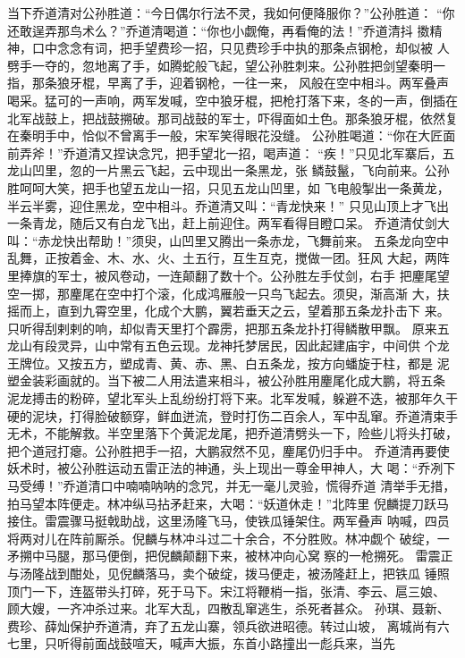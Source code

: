 当下乔道清对公孙胜道：“今日偶尔行法不灵，我如何便降服你？”公孙胜道：
“你还敢逞弄那鸟术么？”乔道清喝道：“你也小觑俺，再看俺的法！”乔道清抖
擞精神，口中念念有词，把手望费珍一招，只见费珍手中执的那条点钢枪，却似被
人劈手一夺的，忽地离了手，如腾蛇般飞起，望公孙胜刺来。公孙胜把剑望秦明一
指，那条狼牙棍，早离了手，迎着钢枪，一往一来，风般在空中相斗。两军叠声
喝采。猛可的一声响，两军发喊，空中狼牙棍，把枪打落下来，冬的一声，倒插在
北军战鼓上，把战鼓搠破。那司战鼓的军士，吓得面如土色。那条狼牙棍，依然复
在秦明手中，恰似不曾离手一般，宋军笑得眼花没缝。
公孙胜喝道：“你在大匠面前弄斧！”乔道清又捏诀念咒，把手望北一招，喝声道：
“疾！”只见北军寨后，五龙山凹里，忽的一片黑云飞起，云中现出一条黑龙，张
鳞鼓鬣，飞向前来。公孙胜呵呵大笑，把手也望五龙山一招，只见五龙山凹里，如
飞电般掣出一条黄龙，半云半雾，迎住黑龙，空中相斗。乔道清又叫：“青龙快来！”
只见山顶上才飞出一条青龙，随后又有白龙飞出，赶上前迎住。两军看得目瞪口呆。
乔道清仗剑大叫：“赤龙快出帮助！”须臾，山凹里又腾出一条赤龙，飞舞前来。
五条龙向空中乱舞，正按着金、木、水、火、土五行，互生互克，搅做一团。狂风
大起，两阵里捧旗的军士，被风卷动，一连颠翻了数十个。公孙胜左手仗剑，右手
把麈尾望空一掷，那麈尾在空中打个滚，化成鸿雁般一只鸟飞起去。须臾，渐高渐
大，扶摇而上，直到九霄空里，化成个大鹏，翼若垂天之云，望着那五条龙扑击下
来。只听得刮剌剌的响，却似青天里打个霹雳，把那五条龙扑打得鳞散甲飘。
原来五龙山有段灵异，山中常有五色云现。龙神托梦居民，因此起建庙宇，中间供
个龙王牌位。又按五方，塑成青、黄、赤、黑、白五条龙，按方向蟠旋于柱，都是
泥塑金装彩画就的。当下被二人用法遣来相斗，被公孙胜用麈尾化成大鹏，将五条
泥龙搏击的粉碎，望北军头上乱纷纷打将下来。北军发喊，躲避不迭，被那年久干
硬的泥块，打得脸破额穿，鲜血迸流，登时打伤二百余人，军中乱窜。乔道清束手
无术，不能解救。半空里落下个黄泥龙尾，把乔道清劈头一下，险些儿将头打破，
把个道冠打瘪。公孙胜把手一招，大鹏寂然不见，麈尾仍归手中。
乔道清再要使妖术时，被公孙胜运动五雷正法的神通，头上现出一尊金甲神人，大
喝：“乔冽下马受缚！”乔道清口中喃喃呐呐的念咒，并无一毫儿灵验，慌得乔道
清举手无措，拍马望本阵便走。林冲纵马拈矛赶来，大喝：“妖道休走！”北阵里
倪麟提刀跃马接住。雷震骤马挺戟助战，这里汤隆飞马，使铁瓜锤架住。两军叠声
呐喊，四员将两对儿在阵前厮杀。倪麟与林冲斗过二十余合，不分胜败。林冲觑个
破绽，一矛搠中马腿，那马便倒，把倪麟颠翻下来，被林冲向心窝察的一枪搠死。
雷震正与汤隆战到酣处，见倪麟落马，卖个破绽，拨马便走，被汤隆赶上，把铁瓜
锤照顶门一下，连盔带头打碎，死于马下。宋江将鞭梢一指，张清、李云、扈三娘、
顾大嫂，一齐冲杀过来。北军大乱，四散乱窜逃生，杀死者甚众。
孙琪、聂新、费珍、薛灿保护乔道清，弃了五龙山寨，领兵欲进昭德。转过山坡，
离城尚有六七里，只听得前面战鼓喧天，喊声大振，东首小路撞出一彪兵来，当先
